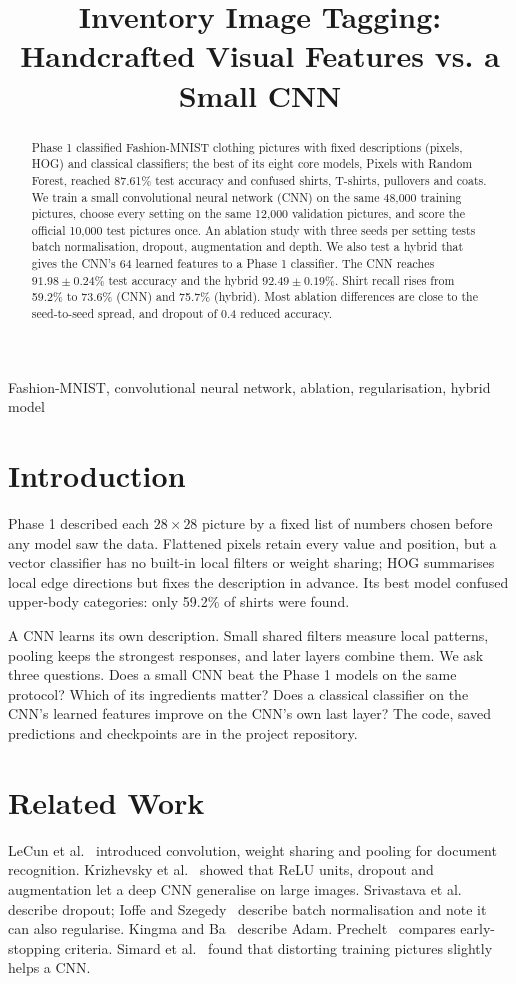 \documentclass[conference]{IEEEtran}
\title{Inventory Image Tagging: Handcrafted Visual Features vs. a Small CNN}
\author{\IEEEauthorblockN{Aryan, Divyanshu Singh, Jatin Kumar Singh, Jatin Verma, Kushagra Bhardwaj}
\IEEEauthorblockA{Enrolments: 2401020013, 2401010161, 2401010199, 2401010200, 2401010247\\
Section B. Contact: aryan.kinha2024@nst.rishihood.edu.in}}
\begin{document}
\maketitle
\begin{abstract}
Phase 1 classified Fashion-MNIST clothing pictures with fixed descriptions (pixels, HOG) and classical classifiers; the best of its eight core models, Pixels with Random Forest, reached 87.61\% test accuracy and confused shirts, T-shirts, pullovers and coats. We train a small convolutional neural network (CNN) on the same 48,000 training pictures, choose every setting on the same 12,000 validation pictures, and score the official 10,000 test pictures once. An ablation study with three seeds per setting tests batch normalisation, dropout, augmentation and depth. We also test a hybrid that gives the CNN's 64 learned features to a Phase 1 classifier. The CNN reaches $91.98\pm0.24$\% test accuracy and the hybrid $92.49\pm0.19$\%. Shirt recall rises from 59.2\% to 73.6\% (CNN) and 75.7\% (hybrid). Most ablation differences are close to the seed-to-seed spread, and dropout of 0.4 reduced accuracy.
\end{abstract}
\begin{IEEEkeywords}Fashion-MNIST, convolutional neural network, ablation, regularisation, hybrid model\end{IEEEkeywords}

\section{Introduction}
Phase 1 described each $28\times28$ picture by a fixed list of numbers chosen before any model saw the data. Flattened pixels retain every value and position, but a vector classifier has no built-in local filters or weight sharing; HOG summarises local edge directions but fixes the description in advance. Its best model confused upper-body categories: only 59.2\% of shirts were found.

A CNN learns its own description. Small shared filters measure local patterns, pooling keeps the strongest responses, and later layers combine them. We ask three questions. Does a small CNN beat the Phase 1 models on the same protocol? Which of its ingredients matter? Does a classical classifier on the CNN's learned features improve on the CNN's own last layer? The code, saved predictions and checkpoints are in the project repository.

\section{Related Work}
LeCun et al.~\cite{lecun} introduced convolution, weight sharing and pooling for document recognition. Krizhevsky et al.~\cite{alexnet} showed that ReLU units, dropout and augmentation let a deep CNN generalise on large images. Srivastava et al.~\cite{dropout} describe dropout; Ioffe and Szegedy~\cite{bn} describe batch normalisation and note it can also regularise. Kingma and Ba~\cite{adam} describe Adam. Prechelt~\cite{prechelt} compares early-stopping criteria. Simard et al.~\cite{simard} found that distorting training pictures slightly helps a CNN.
\end{document}
